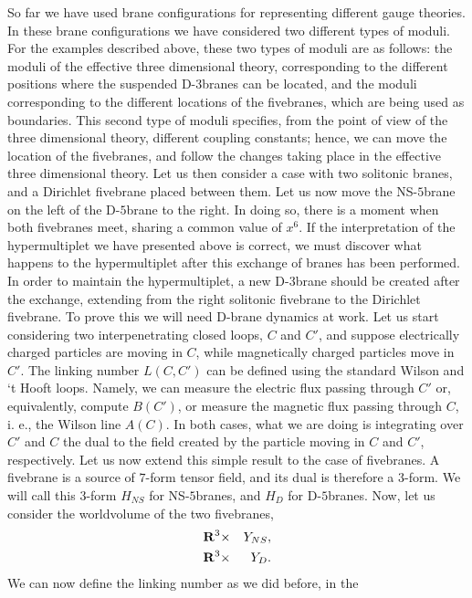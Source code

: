 So far we have used brane configurations for representing
different gauge theories. In these brane configurations we have
considered two different types of moduli. For the examples
described above, these two types of moduli are as follows: the
moduli of the effective three dimensional theory, corresponding
to the different positions where the suspended D-$3$branes can be
located, and the moduli corresponding to the different locations
of the fivebranes, which are being used as boundaries. This
second type of moduli specifies, from the point of view of the
three dimensional theory, different coupling constants; hence, we
can move the location of the fivebranes, and follow the changes
taking place in the effective three dimensional theory. Let us
then consider a case with two solitonic branes, and a Dirichlet
fivebrane placed between them. Let us now move the NS-$5$brane on
the left of the D-$5$brane to the right. In doing so, there is a
moment when both fivebranes meet, sharing a common value of
$x^6$. If the interpretation of the hypermultiplet we have
presented above is correct, we must discover what happens to the
hypermultiplet after this exchange of branes has been performed.
In order to maintain the hypermultiplet, a new D-$3$brane should
be created after the exchange, extending from the right solitonic
fivebrane to the Dirichlet fivebrane. To prove this we will need
D-brane dynamics at work. Let us start considering two
interpenetrating closed loops, $C$ and $C'$, and suppose
electrically charged particles are moving in $C$, while
magnetically charged particles move in $C'$. The linking number
$L(C,C')$ can be defined using the standard Wilson and `t Hooft
loops. Namely, we can measure the electric flux passing through
$C'$ or, equivalently, compute $B(C')$, or measure the magnetic
flux passing through $C$, i. e., the Wilson line $A(C)$. In both
cases, what we are doing is integrating over $C'$ and $C$ the
dual to the field created by the particle moving in $C$ and $C'$,
respectively. Let us now extend this simple result to the case of
fivebranes. A fivebrane is a source of $7$-form tensor field, and
its dual is therefore a $3$-form. We will call this $3$-form
$H_{NS}$ for NS-$5$branes, and $H_D$ for D-$5$branes. Now, let us
consider the worldvolume of the two fivebranes,
\begin{eqnarray}
{\bf R}^3 & \times & Y_{NS}, \nonumber \\
{\bf R}^3 & \times & Y_D.
\label{eq:f14}
\end{eqnarray}
We can now define the linking number as we did before, in the
